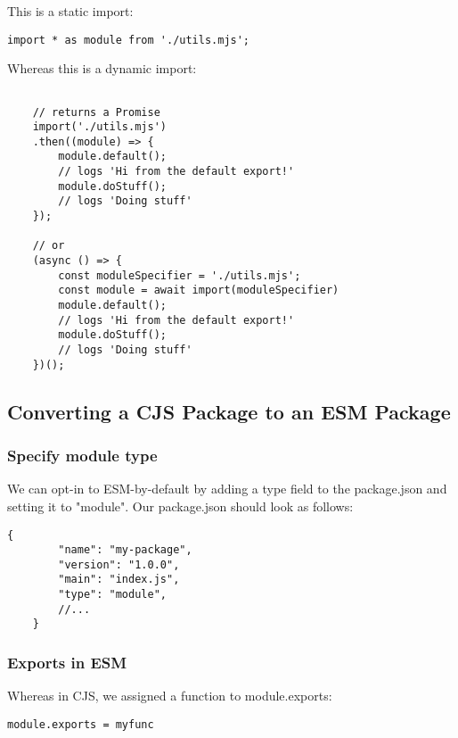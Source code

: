 \documentclass{scrartcl}
\begin{document}
This is a static import:

\begin{lstlisting}[style=ES6]
    import * as module from './utils.mjs';
\end{lstlisting}

Whereas this is a dynamic import:

\begin{lstlisting}[style=ES6]

    // returns a Promise
    import('./utils.mjs')
    .then((module) => {
        module.default();
        // logs 'Hi from the default export!'
        module.doStuff();
        // logs 'Doing stuff'
    });

    // or
    (async () => {
        const moduleSpecifier = './utils.mjs';
        const module = await import(moduleSpecifier)
        module.default();
        // logs 'Hi from the default export!'
        module.doStuff();
        // logs 'Doing stuff'
    })();
\end{lstlisting}

\subsection{Converting a CJS Package to an ESM Package}

\subsubsection{Specify module type}

We can opt-in to ESM-by-default by adding a type field to the package.json and setting it to "module". Our package.json should look as follows:


\begin{lstlisting}[style=ES6]
    {
        "name": "my-package",
        "version": "1.0.0",
        "main": "index.js",
        "type": "module",
        //...
    }

\end{lstlisting}

\subsubsection{Exports in ESM}

Whereas in CJS, we assigned a function to module.exports:

\begin{lstlisting}[style=ES6]
      module.exports = myfunc
\end{lstlisting}
\end{document}
